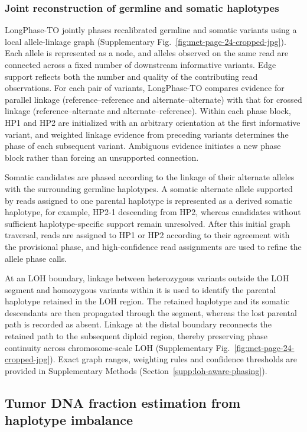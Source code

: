 \documentclass[pdflatex,sn-nature]{sn-jnl}
\begin{document}
\subsubsection{Joint reconstruction of germline and somatic haplotypes}

LongPhase-TO jointly phases recalibrated germline and somatic variants using a local allele-linkage graph (Supplementary Fig.~\ref{fig:met-page-24-cropped-jpg}). Each allele is represented as a node, and alleles observed on the same read are connected across a fixed number of downstream informative variants. Edge support reflects both the number and quality of the contributing read observations. For each pair of variants, LongPhase-TO compares evidence for parallel linkage (reference--reference and alternate--alternate) with that for crossed linkage (reference--alternate and alternate--reference). Within each phase block, HP1 and HP2 are initialized with an arbitrary orientation at the first informative variant, and weighted linkage evidence from preceding variants determines the phase of each subsequent variant. Ambiguous evidence initiates a new phase block rather than forcing an unsupported connection.

Somatic candidates are phased according to the linkage of their alternate alleles with the surrounding germline haplotypes. A somatic alternate allele supported by reads assigned to one parental haplotype is represented as a derived somatic haplotype, for example, HP2-1 descending from HP2, whereas candidates without sufficient haplotype-specific support remain unresolved. After this initial graph traversal, reads are assigned to HP1 or HP2 according to their agreement with the provisional phase, and high-confidence read assignments are used to refine the allele phase calls.

At an LOH boundary, linkage between heterozygous variants outside the LOH segment and homozygous variants within it is used to identify the parental haplotype retained in the LOH region. The retained haplotype and its somatic descendants are then propagated through the segment, whereas the lost parental path is recorded as absent. Linkage at the distal boundary reconnects the retained path to the subsequent diploid region, thereby preserving phase continuity across chromosome-scale LOH (Supplementary Fig.~\ref{fig:met-page-24-cropped-jpg}). Exact graph ranges, weighting rules and confidence thresholds are provided in Supplementary Methods (Section~\ref{supp:loh-aware-phasing}).

\subsection{Tumor DNA fraction estimation from haplotype imbalance}
\end{document}
